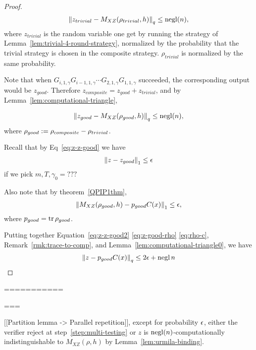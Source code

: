 \begin{proof}
\begin{align}
    \left\lVert z_{trivial} - M_{XZ}(\rho_{trivial},h) \right\rVert_q \leq \operatorname{negl}(n), 
\end{align}
where $z_{trivial}$ is the random variable one get by running the strategy of Lemma~\ref{lem:trivial-4-round-strategy}, normalized by the probability that the trivial strategy is chosen in the composite strategy. $\rho_{trivial}$ is normalized by the same probability.

Note that when $G_{i,1,\gamma}G_{i-1,1,\gamma} \cdots G_{2,1,\gamma}G_{1,1,\gamma}$ succeeded, the corresponding output would be $z_{good}$. Therefore $z_{composite}=z_{good}+z_{trivial}$, and by Lemma~\ref{lem:computational-triangle},  

\begin{align} \label{eq:z-good-rho}
    \left\lVert z_{good} - M_{XZ}(\rho_{good},h) \right\rVert_q \leq \operatorname{negl}(n), 
\end{align}
where $\rho_{good} := \rho_{composite}-\rho_{trivial}$.

Recall that by Eq~\ref{eq:z-z-good} we have
\begin{align} \label{eq:z-z-good2}
    \left\lVert z-z_{good}\right\rVert_1 \leq \epsilon
\end{align}
if we pick $m,T,\gamma_0=???$ 

Also note that by theorem~\ref{QPIP1thm}, 
\begin{align} \label{eq:rho-c}
    \left\lVert M_{XZ}(\rho_{good},h) -p_{good} C(x)\right\rVert_1 \leq \epsilon, 
\end{align}
where $p_{good} = \operatorname{tr} \rho_{good}$.

Putting together Equation~\ref{eq:z-z-good2} \ref{eq:z-good-rho} \ref{eq:rho-c},  Remark~\ref{rmk:trace-to-comp}, and Lemma~\ref{lem:computational-triangle0}, we have  
\begin{align}
    \left\lVert z- p_{good}C(x)\right\rVert_q \leq 2\epsilon +\operatorname{negl}{n}
\end{align}


 
\end{proof}

===========

===

 [[Partition lemma ->  Parallel repetition]], except for probability $\epsilon$, either the verifier reject at step~\ref{step:multi-testing} or $z$ is $\operatorname{negl}(n)$-computationally indistinguishable to $M_{XZ}(\rho,h)$ by Lemma~\ref{lem:urmila-binding}. 
 
